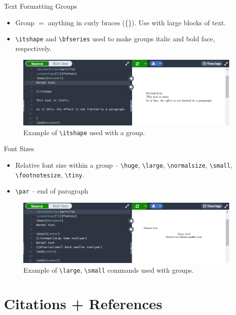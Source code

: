 \documentclass{beamer}
\begin{document}
{  \begin{frame}{Text Formatting Groups}
    \begin{itemize}
      \item Group $=$ anything in curly braces (\{\}). Use with large blocks of text.
      \item \texttt{\textbackslash itshape} and \texttt{\textbackslash bfseries} used to make groups italic and bold face, respectively.
    \end{itemize}
    \begin{figure}
      \includegraphics[width=0.8\linewidth]{day02-02C-groups.png}
      \caption{Example of \texttt{\textbackslash itshape} used with a group.}
      \label{fig:day02-02C}
    \end{figure}
  \end{frame}

  \begin{frame}{Font Sizes}
  \begin{itemize}
    \item Relative font size within a group -- \texttt{\textbackslash huge}, \texttt{\textbackslash large}, \texttt{\textbackslash normalsize}, \texttt{\textbackslash small}, \texttt{\textbackslash footnotesize}, \texttt{\textbackslash tiny}.
    \item \texttt{\textbackslash par} -- end of paragraph
  \end{itemize}
    \begin{figure}
      \includegraphics[width=0.8\linewidth]{day02-02D-fontsize.png}
      \caption{Example of \texttt{\textbackslash large}, \texttt{\textbackslash small} commands used with groups.}
      \label{fig:day02-02D}
    \end{figure}
  \end{frame}

\section{Citations + References}

}
\end{document}
